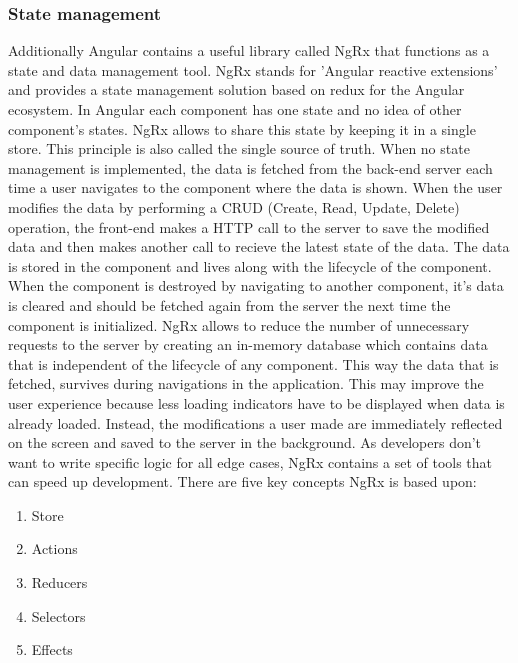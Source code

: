 \subsubsection{State management}
Additionally Angular contains a useful library called NgRx that functions as a state and data management tool. NgRx stands for 'Angular reactive extensions' and provides a state management solution based on redux for the Angular ecosystem. In Angular each component has one state and no idea of other component's states. NgRx allows to share this state by keeping it in a single store. This principle is also called the single source of truth. When no state management is implemented, the data is fetched from the back-end server each time a user navigates to the component where the data is shown. When the user modifies the data by performing a CRUD (Create, Read, Update, Delete) operation, the front-end makes a HTTP call to the server to save the modified data and then makes another call to recieve the latest state of the data. The data is stored in the component and lives along with the lifecycle of the component. When the component is destroyed by navigating to another component, it's data is cleared and should be fetched again from the server the next time the component is initialized. NgRx allows to reduce the number of unnecessary requests to the server by creating an in-memory database which contains data that is independent of the lifecycle of any component. This way the data that is fetched, survives during navigations in the application. This may improve the user experience because less loading indicators have to be displayed when data is already loaded. Instead, the modifications a user made are immediately reflected on the screen and saved to the server in the background. As developers don't want to write specific logic for all edge cases, NgRx contains a set of tools that can speed up development. There are five key concepts NgRx is based upon:
\begin{enumerate}
	\item Store
	\item Actions
	\item Reducers
	\item Selectors
	\item Effects
\end{enumerate}

